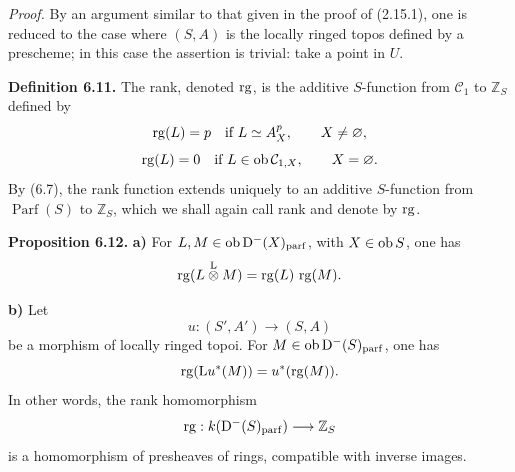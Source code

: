 \documentclass[11pt]{article}
\newcommand{\cl}{\operatorname{cl}}
\newcommand{\Parf}{\operatorname{Parf}}
\newcommand{\Tor}{\operatorname{Tor}}
\providecommand{\cC}{\mathcal C}
\providecommand{\Tor}{\operatorname{Tor}}
\providecommand{\Ker}{\operatorname{Ker}}
\begin{document}
\emph{Proof.} By an argument similar to that given in the proof of (2.15.1), one is reduced to the case where \((S,A)\) is the locally ringed topos defined by a prescheme; in this case the assertion is trivial: take a point in \(U\).

\textbf{Definition 6.11.} The rank, denoted \(\rg\), is the additive \(S\)-function from \(\mathcal C_1\) to \(\mathbb Z_S\) defined by
\[
  \rg(L)=p\quad\text{if } L\simeq A_X^p,
  \qquad X\ne\varnothing,
\]
\[
  \rg(L)=0\quad\text{if } L\in\Ob\mathcal C_{1,X},
  \qquad X=\varnothing.
\]
By (6.7), the rank function extends uniquely to an additive \(S\)-function from \(\Parf(S)\) to \(\mathbb Z_S\), which we shall again call rank and denote by \(\rg\).

\textbf{Proposition 6.12.} \textbf{a)} For \(L,M\in\Ob\Dpx^-(X)_{\mathrm{parf}}\), with \(X\in\Ob S\), one has
\[
  \rg(L\overset{\mathrm L}{\otimes} M)=\rg(L)\,\rg(M).
\]

\textbf{b)} Let
\[
  u:(S',A')\longrightarrow(S,A)
\]
be a morphism of locally ringed topoi. For \(M\in\Ob\Dpx^-(S)_{\mathrm{parf}}\), one has
\[
  \rg(\mathrm L u^*(M))=u^*(\rg(M)).
\]
In other words, the rank homomorphism
\[
  \rg:k(\Dpx^-(S)_{\mathrm{parf}})\longrightarrow \mathbb Z_S
\]
is a homomorphism of presheaves of rings, compatible with inverse images.



\providecommand{\Cpx}{\mathrm C}
\providecommand{\Kpx}{\mathrm K}
\providecommand{\Dpx}{\mathrm D}
\providecommand{\Ho}{\mathrm H}
\providecommand{\RHom}{\mathrm R\!\operatorname{Hom}}
\providecommand{\Ob}{\operatorname{ob}}
\providecommand{\Hom}{\operatorname{Hom}}
\providecommand{\RHom}{\mathrm R\!\operatorname{Hom}}
\providecommand{\Ext}{\operatorname{Ext}}
\providecommand{\Tor}{\operatorname{Tor}}
\providecommand{\Tr}{\operatorname{Tr}}
\providecommand{\Add}{\operatorname{Add}}
\providecommand{\Cart}{\operatorname{Cart}}
\providecommand{\Parf}{\operatorname{Parf}}
\providecommand{\coh}{\operatorname{coh}}
\providecommand{\amp}{\operatorname{amp}}
\providecommand{\cl}{\operatorname{cl}}
\providecommand{\rg}{\operatorname{rg}}
\providecommand{\Id}{\operatorname{Id}}
\providecommand{\Ker}{\operatorname{Ker}}
\providecommand{\Im}{\operatorname{Im}}
\providecommand{\cH}{\mathcal H}
\providecommand{\Zs}{\mathbb Z_S}
\providecommand{\A}{\mathcal A}
\providecommand{\cC}{\mathcal C}
\providecommand{\cCzero}{\mathcal C_0}
\providecommand{\otL}{\mathop{\otimes}^{\mathrm L}}
\providecommand{\tamp}{\operatorname{tor.amp}}
\providecommand{\pamp}{\operatorname{parf.amp}}
\providecommand{\pdim}{\operatorname{parf.dim}}
\providecommand{\bon}{\mathrm b}
\providecommand{\parf}{\operatorname{parf}}
\providecommand{\parff}{\operatorname{parf}}
\providecommand{\ac}{\mathrm{ac}}
\end{document}
